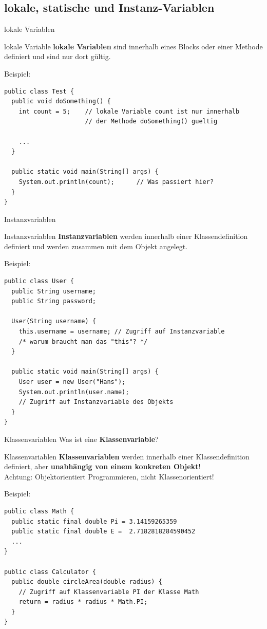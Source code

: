 \documentclass[18pt]{beamer}
\begin{document}
\subsection{lokale, statische und Instanz-Variablen}
\begin{frame}[fragile]{lokale Variablen}
	\begin{block}{lokale Variable}
    \textbf{lokale Variablen} sind innerhalb eines Blocks oder einer Methode definiert und sind nur dort gültig.
  \end{block}
  Beispiel:
    \begin{lstlisting}
public class Test {   
  public void doSomething() {
    int count = 5;    // lokale Variable count ist nur innerhalb 
                      // der Methode doSomething() gueltig
    
    ...
  }
  
  public static void main(String[] args) {
    System.out.println(count);      // Was passiert hier?
  }
}\end{lstlisting}
\end{frame}

\begin{frame}[fragile]{Instanzvariablen}
	\begin{block}{Instanzvariablen}
    \textbf{Instanzvariablen} werden innerhalb einer Klassendefinition definiert und werden zusammen mit dem Objekt angelegt.
  \end{block}
  Beispiel:
    \begin{lstlisting}
public class User {   
  public String username;
  public String password;
  
  User(String username) {
    this.username = username; // Zugriff auf Instanzvariable
    /* warum braucht man das "this"? */
  }
  
  public static void main(String[] args) {
    User user = new User("Hans");
    System.out.println(user.name);
    // Zugriff auf Instanzvariable des Objekts
  }
}\end{lstlisting}
\end{frame}

\begin{frame}[fragile]{Klassenvariablen}
  Was ist eine \textbf{Klassenvariable}?
  \pause
	\begin{block}{Klassenvariablen}
    \textbf{Klassenvariablen} werden innerhalb einer Klassendefinition definiert, aber \textbf{unabhängig von einem konkreten Objekt}!\\
    \pause
    \textcolor[rgb]{1,0,0}{Achtung: Objektorientiert Programmieren, nicht Klassenorientiert!}
  \end{block}
  Beispiel:
    \begin{lstlisting}
public class Math {   
  public static final double Pi = 3.14159265359
  public static final double E =  2.7182818284590452
  ...
}

public class Calculator {
  public double circleArea(double radius) {
    // Zugriff auf Klassenvariable PI der Klasse Math
    return = radius * radius * Math.PI;
  }
}\end{lstlisting}
\end{frame}
\end{document}
